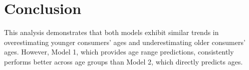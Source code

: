 \documentclass[10pt]{article}
\begin{document}



\section{Conclusion}
This analysis demonstrates that both models exhibit similar trends in overestimating younger consumers' ages and underestimating older consumers' ages. However, Model 1, which provides age range predictions, consistently performs better across age groups than Model 2, which directly predicts ages.
\end{document}
